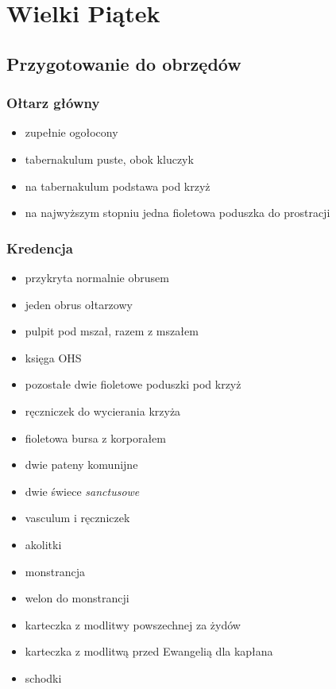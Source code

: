 \chapter{Wielki Piątek}

\section{Przygotowanie do obrzędów}

\subsection{Ołtarz główny}

\begin{itemize}
    \item zupełnie ogołocony
    \item tabernakulum puste, obok kluczyk
    \item na tabernakulum podstawa pod krzyż
    \item na najwyższym stopniu jedna {\color{violet} fioletowa} poduszka do prostracji
\end{itemize}

\subsection{Kredencja}

\begin{itemize}
    \item przykryta normalnie obrusem
    \item jeden obrus ołtarzowy
    \item pulpit pod mszał, razem z mszałem
    \item księga OHS
    \item pozostałe dwie fioletowe poduszki pod krzyż
    \item ręczniczek do wycierania krzyża
    \item {\color{violet} fioletowa} bursa z korporałem
    \item dwie pateny komunijne
    \item dwie świece \textit{sanctusowe}
    \item vasculum i ręczniczek
    \item akolitki
    \item monstrancja
    \item welon do monstrancji
    \item karteczka z modlitwy powszechnej za żydów
    \item karteczka z modlitwą przed Ewangelią dla kapłana
    \item schodki
\end{itemize}

